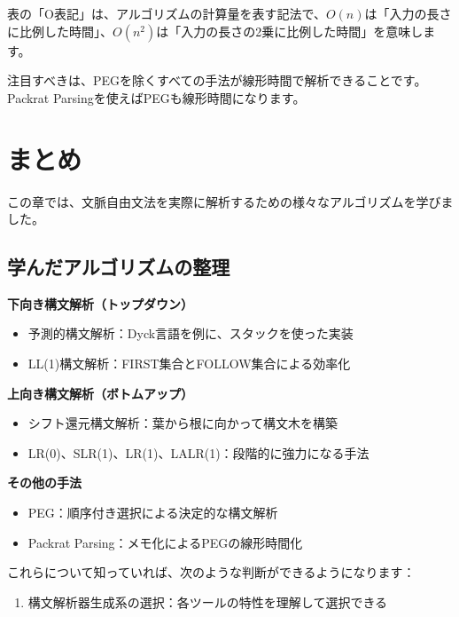 表の「O表記」は、アルゴリズムの計算量を表す記法で、\(O(n)\)は「入力の長さに比例した時間」、\(O(n^2)\)は「入力の長さの2乗に比例した時間」を意味します。

注目すべきは、PEGを除くすべての手法が線形時間で解析できることです。Packrat
Parsingを使えばPEGも線形時間になります。

\hypertarget{chapter5-ux307eux3068ux3081}{%
\section{まとめ}\label{chapter5-ux307eux3068ux3081}}

この章では、文脈自由文法を実際に解析するための様々なアルゴリズムを学びました。

\hypertarget{chapter5-ux5b66ux3093ux3060ux30a2ux30ebux30b4ux30eaux30baux30e0ux306eux6574ux7406}{%
\subsection{学んだアルゴリズムの整理}\label{chapter5-ux5b66ux3093ux3060ux30a2ux30ebux30b4ux30eaux30baux30e0ux306eux6574ux7406}}

\textbf{下向き構文解析（トップダウン）}

\begin{itemize}
\tightlist
\item
  予測的構文解析：Dyck言語を例に、スタックを使った実装
\item
  LL(1)構文解析：FIRST集合とFOLLOW集合による効率化
\end{itemize}

\textbf{上向き構文解析（ボトムアップ）}

\begin{itemize}
\tightlist
\item
  シフト還元構文解析：葉から根に向かって構文木を構築
\item
  LR(0)、SLR(1)、LR(1)、LALR(1)：段階的に強力になる手法
\end{itemize}

\textbf{その他の手法}

\begin{itemize}
\tightlist
\item
  PEG：順序付き選択による決定的な構文解析
\item
  Packrat Parsing：メモ化によるPEGの線形時間化
\end{itemize}

これらについて知っていれば、次のような判断ができるようになります：

\begin{enumerate}
\def\labelenumi{\arabic{enumi}.}
\tightlist
\item
  構文解析器生成系の選択：各ツールの特性を理解して選択できる
\end{enumerate}

